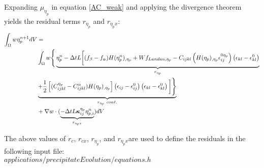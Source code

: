 \documentclass[11pt]{article}
\renewcommand{\=}[1]{\stackrel{#1}{=}} %
\theoremstyle{definition}
\theoremstyle{remark}
\def\Bkappa{\mbox{\boldmath$\kappa$}}
\begin{document}
Expanding $\mu_{\eta_p}$ in equation \ref{AC_weak} and applying the divergence theorem yields the residual terms $r_{\eta_p}$ and $r_{\eta_p x}$:
\begin{equation}
\begin{split}
\int_\Omega w \eta_p^{n+1} dV &= \\
&\int_\Omega w \Bigg\{\underbrace{\eta_p^{n}-\Delta t L \bigg[(f_{\beta}-f_{\alpha})H(\eta_p^n)_{,\eta_p} + W f_{Landau,\eta_p} - C_{ijkl} \left( H(\eta_p)_{,\eta_p} \epsilon_{ij}^{0 \eta_p}\right)\left(\epsilon_{kl} - \epsilon_{kl}^{0} \right) }_{r_{\eta_p}} \\
&\underbrace{+ \frac{1}{2} \left[ (C_{ijkl}^{\eta_p} - C_{ijkl}^{\alpha}) H(\eta_p)_{,\eta_p} \right] \left(\epsilon_{ij} - \epsilon_{ij}^{0} \right) \left(\epsilon_{kl} - \epsilon_{kl}^{0} \right) \bigg] \Bigg\}}_{r_{\eta_p}~cont.}  \\
&+ \nabla w \cdot (\underbrace{-\Delta t  L \Bkappa^{\eta_p}_{ij} \eta_{p,i}^n}_{r_{\eta_p x}} ) dV 
\end{split}
\end{equation}

The above values of $r_c$, $r_{cx}$,  $r_{\eta_p}$, and $r_{\eta_p x}$are used to define the residuals in the following input file: \\
$applications/precipitateEvolution/equations.h$
\end{document}

